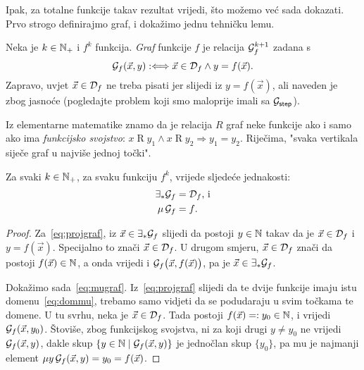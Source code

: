 Ipak, za totalne funkcije takav rezultat vrijedi, što možemo već sada dokazati. Prvo strogo definirajmo graf, i dokažimo jednu tehničku lemu.

\begin{definicija}
Neka je $k\in{\mathbb N}_+$ i $f^k$ funkcija. \emph{Graf} funkcije $f$ je relacija $\mathcal G_{f}^{k+1}$ zadana s
\begin{equation}
    \label{eq:defgraf}\mathcal G_{f}(\vec x,y):\Longleftrightarrow\vec x\in\mathcal D_{f}\land y=f(\vec x)\text.
\end{equation}
Zapravo, uvjet $\vec x\in\mathcal D_{f}$ ne treba pisati jer slijedi iz $y=f(\vec x)$, ali naveden je zbog jasnoće (pogledajte problem koji smo maloprije imali sa $\mathcal G_{\mathsf{step}}$).
\end{definicija}

\begin{napomena}\label{nap:graf=funsv}
Iz elementarne matematike znamo da je relacija $R$ graf neke funkcije ako i samo ako ima \emph{funkcijsko svojstvo}: $x\mathrel R y_1\land x\mathrel R y_2\Rightarrow y_1=y_2$. Riječima, "svaka vertikala siječe graf u najviše jednoj točki".
\end{napomena}

\begin{lema}\label{lm:projmugraf}
Za svaki $k\in{\mathbb N}_+$, za svaku funkciju $f^k$, vrijede sljedeće jednakosti:
\begin{align}
    \label{eq:projgraf}\exists_*\mathcal G_{f}&=\mathcal D_{f}\text{, i}\\
    \label{eq:mugraf}\mu\,\mathcal G_{f}&=f\text.
\end{align}
\end{lema}
\begin{proof}
Za~\eqref{eq:projgraf}, iz $\vec x\in\exists_*\mathcal G_{f}$ slijedi da postoji $y\in{\mathbb N}$ takav da je $\vec x\in\mathcal D_{f}$ i $y=f(\vec x)$. Specijalno to znači $\vec x\in\mathcal D_{f}$. U drugom smjeru, $\vec x\in\mathcal D_{f}$ znači da postoji $f(\vec x)\in{\mathbb N}$, a onda vrijedi i $\mathcal G_{f}\bigl(\vec x,f(\vec x)\bigr)$, pa je $\vec x\in\exists_*\mathcal G_{f}$.

Dokažimo sada~\eqref{eq:mugraf}. Iz~\eqref{eq:projgraf} slijedi da te dvije funkcije imaju istu domenu~\eqref{eq:dommu}, trebamo samo vidjeti da se podudaraju u svim točkama te domene. U tu svrhu, neka je $\vec x\in\mathcal D_{f}$. Tada postoji $f(\vec x)=:y_0\in{\mathbb N}$, i vrijedi $\mathcal G_{f}(\vec x,y_0)$. Štoviše, zbog funkcijskog svojstva, ni za koji drugi $y\not=y_0$ ne vrijedi $\mathcal G_{f}(\vec x,y)$, dakle skup $\{y\in{\mathbb N}\mid\mathcal G_{f}(\vec x,y)\}$ je jednočlan skup $\{y_0\}$, pa mu je najmanji element $\mu y\,\mathcal G_{f}(\vec x,y)=y_0=f(\vec x)$.
\end{proof}

